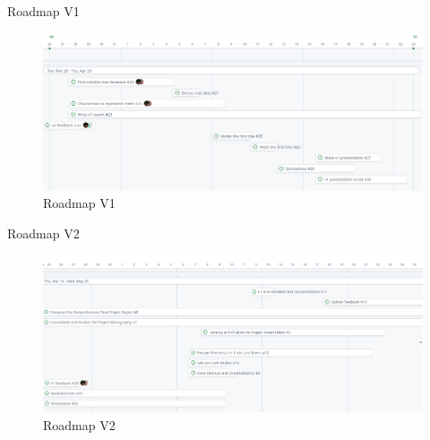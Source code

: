 \documentclass[10pt]{beamer}
\begin{document}
\begin{frame}{Roadmap V1}
  \begin{figure}[h] %
    \centering
    \includegraphics[width=1\textwidth]{images/roadmap_v1.png}
    \caption{Roadmap V1} %
    \label{fig:roadmap1} %
    \end{figure}
\end{frame}

\begin{frame}{Roadmap V2}
  \begin{figure}[h] %
    \centering
    \includegraphics[width=1\textwidth]{images/roadmap_v2.png}
    \caption{Roadmap V2} %
    \label{fig:roadmap2} %
    \end{figure}
\end{frame}





\end{document}
